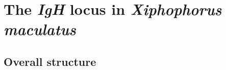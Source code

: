 %
%



\section{The \textit{IgH} locus in \textit{Xiphophorus maculatus}}

	\subsection{Overall structure}
	
